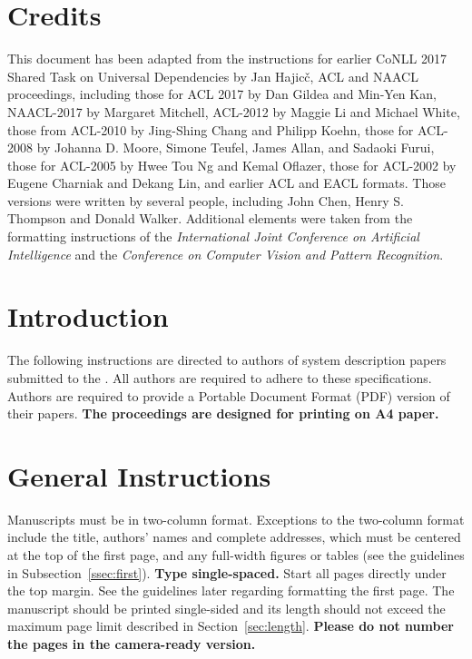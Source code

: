 \documentclass[11pt,a4paper]{article}
\begin{document}
\section{Credits}

This document has been adapted from the instructions for earlier 
CoNLL 2017 Shared Task on Universal Dependencies by Jan Hajic\v{c}, ACL
and NAACL proceedings, including those for ACL 2017 by Dan Gildea and
Min-Yen Kan, NAACL-2017 by Margaret Mitchell, ACL-2012 by Maggie Li
and Michael White, those from ACL-2010 by Jing-Shing Chang and Philipp
Koehn, those for ACL-2008 by Johanna D. Moore, Simone Teufel, James
Allan, and Sadaoki Furui, those for ACL-2005 by Hwee Tou Ng and Kemal
Oflazer, those for ACL-2002 by Eugene Charniak and Dekang Lin, and
earlier ACL and EACL formats. Those versions were written by several
people, including John Chen, Henry S. Thompson and Donald
Walker. Additional elements were taken from the formatting
instructions of the {\em International Joint Conference on Artificial
  Intelligence} and the \emph{Conference on Computer Vision and
  Pattern Recognition}.

\section{Introduction}

The following instructions are directed to authors of system description 
papers submitted
to the \udst{}. All
authors are required to adhere to these specifications. Authors are
required to provide a Portable Document Format (PDF) version of their
papers. \textbf{The proceedings are designed for printing on A4
paper.}

\section{General Instructions}

Manuscripts must be in two-column format.  Exceptions to the
two-column format include the title, authors' names and complete
addresses, which must be centered at the top of the first page, and
any full-width figures or tables (see the guidelines in
Subsection~\ref{ssec:first}). {\bf Type single-spaced.}  Start all
pages directly under the top margin. See the guidelines later
regarding formatting the first page.  The manuscript should be
printed single-sided and its length
should not exceed the maximum page limit described in Section~\ref{sec:length}.
{\bf Please do not number the pages in the camera-ready version.}
\end{document}
